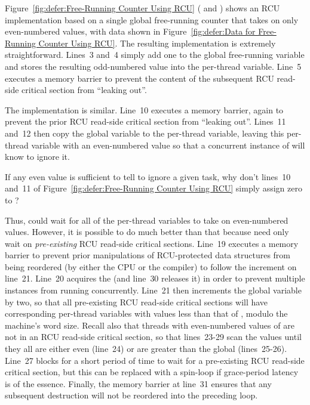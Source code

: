 Figure~\ref{fig:defer:Free-Running Counter Using RCU}
( and )
shows an RCU implementation based on a single global free-running counter
that takes on only even-numbered values, with data shown in
Figure~\ref{fig:defer:Data for Free-Running Counter Using RCU}.
The resulting  implementation is extremely
straightforward.
Lines~3 and~4 simply add one to the global free-running 
variable and stores the resulting odd-numbered value into the
 per-thread variable.
Line~5 executes a memory barrier to prevent the content of the
subsequent RCU read-side critical section from ``leaking out''.

The  implementation is similar.
Line~10 executes a memory barrier, again to prevent the prior RCU
read-side critical section from ``leaking out''.
Lines~11 and~12 then copy the  global variable to the
 per-thread variable, leaving this per-thread
variable with an even-numbered value so that a concurrent instance
of  will know to ignore it.

\QuickQuiz{}
	If any even value is sufficient to tell 
	to ignore a given task, why don't lines~10 and~11 of
	Figure~\ref{fig:defer:Free-Running Counter Using RCU}
	simply assign zero to ?
 \QuickQuizEnd

Thus,  could wait for all of the per-thread
 variables to take on even-numbered values.
However, it is possible to do much better than that because
 need only wait on \emph{pre-existing}
RCU read-side critical sections.
Line~19 executes a memory barrier to prevent prior manipulations
of RCU-protected data structures from being reordered (by either
the CPU or the compiler) to follow the increment on line~21.
Line~20 acquires the  (and line~30 releases it)
in order to prevent multiple
 instances from running concurrently.
Line~21 then increments the global  variable by
two, so that all pre-existing RCU read-side critical sections will
have corresponding per-thread  variables with
values less than that of , modulo the machine's
word size.
Recall also that threads with even-numbered values of 
are not in an RCU read-side critical section,
so that lines~23-29 scan the  values until they
all are either even (line~24) or are greater than the global
 (lines~25-26).
Line~27 blocks for a short period of time to wait for a
pre-existing RCU read-side critical section, but this can be replaced with
a spin-loop if grace-period latency is of the essence.
Finally, the memory barrier at line~31 ensures that any subsequent
destruction will not be reordered into the preceding loop.

